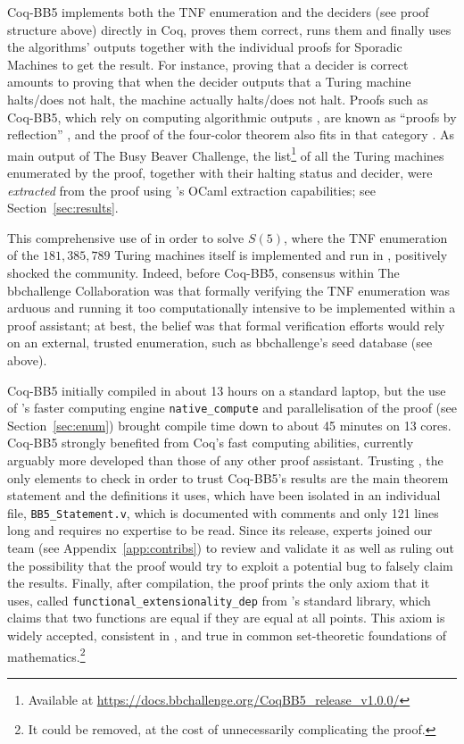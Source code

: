 \documentclass[a4paper,british]{article}
\theoremstyle{definition} %
\numberwithin{equation}{section}
\theoremstyle{definition} %
\newcommand{\BBtheFifthTNF}{181{,}385{,}789}
\newcommand{\CoqBB}{Coq-BB5\xspace}
\begin{document}
\CoqBB implements both the TNF enumeration and the deciders (see proof structure above) directly in Coq, proves them correct, runs them and finally uses the algorithms' outputs together with the individual proofs for Sporadic Machines to get the result. For instance, proving that a decider is correct amounts to proving that when the decider outputs that a Turing machine halts/does not halt, the machine actually halts/does not halt. Proofs such as \CoqBB, which rely on computing algorithmic outputs \cite{vmcompute,nativecompute}, are known as ``proofs by reflection'' \cite{boutin1997using}, and the \Coq proof of the four-color theorem also fits in that category \cite{gonthier2010introduction}. As main output of The Busy Beaver Challenge, the list\footnote{Available at \url{https://docs.bbchallenge.org/CoqBB5_release_v1.0.0/}} of all the Turing machines enumerated by the \Coq proof, together with their halting status and decider, were \textit{extracted} from the proof using \Coq's OCaml extraction capabilities; see Section~\ref{sec:results}.

This comprehensive use of \Coq in order to solve $S(5)$, where the TNF enumeration of the $\BBtheFifthTNF$ Turing machines itself is implemented and run in \Coq, positively shocked the community. Indeed, before \CoqBB, consensus within The bbchallenge Collaboration  was that formally verifying the TNF enumeration was arduous and running it too computationally intensive to be implemented within a proof assistant; at best, the belief was that formal verification efforts would rely on an external, trusted enumeration, such as bbchallenge's seed database (see above).




\enlargethispage{\baselineskip}
\CoqBB initially compiled in about 13 hours on a standard laptop, but the use of \Coq's faster computing engine \texttt{native\_compute} \cite{nativecompute} and parallelisation of the proof (see Section~\ref{sec:enum}) brought compile time down to about 45 minutes on 13 cores. \CoqBB strongly benefited from Coq’s fast computing abilities, currently arguably more developed than those of any other proof assistant. Trusting \Coq, the only elements to check in order to trust \CoqBB's results are the main theorem statement and the definitions it uses, which have been isolated in an individual file, \texttt{BB5\_Statement.v}, which is documented with comments and only 121 lines long and requires no \Coq expertise to be read. Since its release, \Coq experts joined our team (see Appendix~\ref{app:contribs}) to review and validate it as well as ruling out the possibility that the proof would try to exploit a potential \Coq bug to falsely claim the results. Finally, after compilation, the proof prints the only axiom that it uses, called \texttt{functional\_extensionality\_dep} from \Coq's standard library, which claims that two functions are equal if they are equal at all points. This axiom is widely accepted, consistent in \Coq, and true in common set-theoretic foundations of mathematics.\footnote{It could be removed, at the cost of unnecessarily complicating the proof.}
\end{document}
